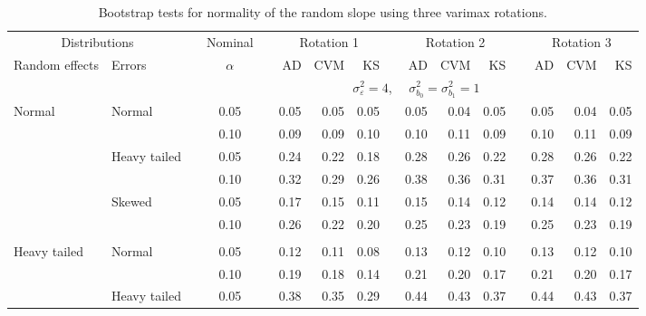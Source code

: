 \documentclass[12pt]{article} %
\begin{document}
\begin{table}[ht]
\begin{scriptsize}
\begin{center}
\begin{tabular}{ll p{.1cm} c p{.1cm} rrr p{.1cm} rrr p{.1cm} rrr}
   \hline
\end{tabular}
\end{center}
\end{scriptsize}
\end{table}

\begin{table}[ht]
\caption{Bootstrap tests for normality of the random slope using three varimax rotations.}
\begin{scriptsize}
\begin{center}
\begin{tabular}{ll p{.1cm} c p{.1cm} rrr p{.1cm} rrr p{.1cm} rrr}
  \hline
  \multicolumn{2}{c}{Distributions}& & Nominal & &  \multicolumn{3}{c}{Rotation 1} & & \multicolumn{3}{c}{Rotation 2} & & \multicolumn{3}{c}{Rotation 3}\\ \cline{1-2} \cline{6-8} \cline{10-12} \cline{14-16}
  Random effects & Errors & & $\alpha$ & & AD & CVM & KS & & AD & CVM & KS & & AD & CVM & KS \\ 
   \hline
& && && \multicolumn{9}{c}{$\sigma_{\varepsilon}^2 = 4$, \ \ $\sigma_{b_0}^2 = \sigma_{b_1}^2 = 1$} \\ \cline{6-16}
\rowcolor{gray!20}Normal       & Normal       && 0.05 &&   0.05 & 0.05 & 0.05 && 0.05 & 0.04 & 0.05 && 0.05 & 0.04 & 0.05 \\ 
\rowcolor{gray!20}             &              && 0.10 &&   0.09 & 0.09 & 0.10 && 0.10 & 0.11 & 0.09 && 0.10 & 0.11 & 0.09 \\ 
\rowcolor{gray!20}             & Heavy tailed && 0.05 &&   0.24 & 0.22 & 0.18 && 0.28 & 0.26 & 0.22 && 0.28 & 0.26 & 0.22 \\ 
\rowcolor{gray!20}             &              && 0.10 &&   0.32 & 0.29 & 0.26 && 0.38 & 0.36 & 0.31 && 0.37 & 0.36 & 0.31 \\ 
\rowcolor{gray!20}             & Skewed       && 0.05 &&   0.17 & 0.15 & 0.11 && 0.15 & 0.14 & 0.12 && 0.14 & 0.14 & 0.12 \\ 
\rowcolor{gray!20}             &              && 0.10 &&   0.26 & 0.22 & 0.20 && 0.25 & 0.23 & 0.19 && 0.25 & 0.23 & 0.19 \\ 
             &&&&&&&&&&&&&&&\\
Heavy tailed & Normal       && 0.05 &&   0.12 & 0.11 & 0.08 && 0.13 & 0.12 & 0.10 && 0.13 & 0.12 & 0.10 \\ 
             &              && 0.10 &&   0.19 & 0.18 & 0.14 && 0.21 & 0.20 & 0.17 && 0.21 & 0.20 & 0.17 \\ 
             & Heavy tailed && 0.05 &&   0.38 & 0.35 & 0.29 && 0.44 & 0.43 & 0.37 && 0.44 & 0.43 & 0.37 \\ 

\end{tabular}
\end{center}
\end{scriptsize}
\end{table}
\end{document}

